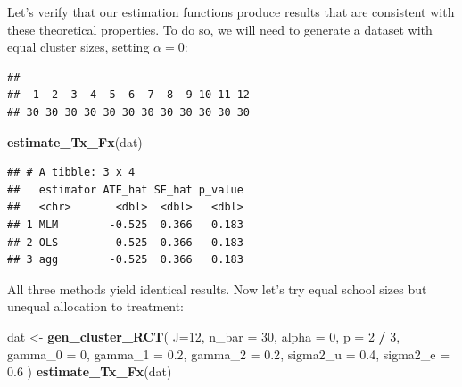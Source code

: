 \documentclass[
]{book}
\newenvironment{Shaded}{\begin{snugshade}}{\end{snugshade}}
\newcommand{\AttributeTok}[1]{\textcolor[rgb]{0.13,0.29,0.53}{#1}}
\newcommand{\CommentTok}[1]{\textcolor[rgb]{0.56,0.35,0.01}{\textit{#1}}}
\newcommand{\DecValTok}[1]{\textcolor[rgb]{0.00,0.00,0.81}{#1}}
\newcommand{\FloatTok}[1]{\textcolor[rgb]{0.00,0.00,0.81}{#1}}
\newcommand{\FunctionTok}[1]{\textcolor[rgb]{0.13,0.29,0.53}{\textbf{#1}}}
\newcommand{\NormalTok}[1]{#1}
\newcommand{\OtherTok}[1]{\textcolor[rgb]{0.56,0.35,0.01}{#1}}
\newcommand{\SpecialCharTok}[1]{\textcolor[rgb]{0.81,0.36,0.00}{\textbf{#1}}}
\begin{document}
Let's verify that our estimation functions produce results that are consistent with these theoretical properties.
To do so, we will need to generate a dataset with equal cluster sizes, setting \(\alpha = 0\):

\begin{Shaded}
\end{Shaded}

\begin{verbatim}
## 
##  1  2  3  4  5  6  7  8  9 10 11 12 
## 30 30 30 30 30 30 30 30 30 30 30 30
\end{verbatim}

\begin{Shaded}
\begin{Highlighting}[]
\FunctionTok{estimate\_Tx\_Fx}\NormalTok{(dat)}
\end{Highlighting}
\end{Shaded}

\begin{verbatim}
## # A tibble: 3 x 4
##   estimator ATE_hat SE_hat p_value
##   <chr>       <dbl>  <dbl>   <dbl>
## 1 MLM        -0.525  0.366   0.183
## 2 OLS        -0.525  0.366   0.183
## 3 agg        -0.525  0.366   0.183
\end{verbatim}

All three methods yield identical results.
Now let's try equal school sizes but unequal allocation to treatment:

\begin{Shaded}
\begin{Highlighting}[]
\NormalTok{dat }\OtherTok{\textless{}{-}} \FunctionTok{gen\_cluster\_RCT}\NormalTok{( }
  \AttributeTok{J=}\DecValTok{12}\NormalTok{, }\AttributeTok{n\_bar =} \DecValTok{30}\NormalTok{, }\AttributeTok{alpha =} \DecValTok{0}\NormalTok{, }\AttributeTok{p =} \DecValTok{2} \SpecialCharTok{/} \DecValTok{3}\NormalTok{, }
  \AttributeTok{gamma\_0 =} \DecValTok{0}\NormalTok{, }\AttributeTok{gamma\_1 =} \FloatTok{0.2}\NormalTok{, }\AttributeTok{gamma\_2 =} \FloatTok{0.2}\NormalTok{,}
  \AttributeTok{sigma2\_u =} \FloatTok{0.4}\NormalTok{, }\AttributeTok{sigma2\_e =} \FloatTok{0.6}
\NormalTok{)}
\FunctionTok{estimate\_Tx\_Fx}\NormalTok{(dat)}
\end{Highlighting}
\end{Shaded}
\end{document}
